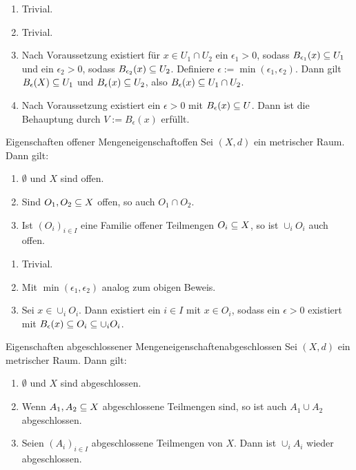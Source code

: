 \begin{beweis}
\begin{enumerate}
\item Trivial.
\item Trivial.
\item Nach Voraussetzung existiert für $x \in U_1 \cap U_2$ ein $\epsilon_1 > 0$, sodass $B_{\epsilon_1} (x) \subseteq U_1$ und ein $\epsilon_2 > 0$, sodass $B_{\epsilon_2} (x) \subseteq U_2$. Definiere $\epsilon := \min (\epsilon_1, \epsilon_2)$. Dann gilt $B_\epsilon (X) \subseteq U_1$ und $B_\epsilon (x) \subseteq U_2$, also $B_\epsilon (x) \subseteq U_1 \cap U_2$.
\item Nach Voraussetzung existiert ein $\epsilon > 0$ mit $B_\epsilon (x) \subseteq U$. Dann ist die Behauptung durch $V:=B_\epsilon(x)$ erfüllt.
\end{enumerate}
\end{beweis}
\begin{satz}{Eigenschaften offener Mengen}{eigenschaftoffen}
Sei $(X,d)$ ein metrischer Raum. Dann gilt:
\begin{enumerate}
\item $\emptyset$ und $X$ sind offen.
\item Sind $O_1, O_2 \subseteq X$ offen, so auch $O_1 \cap O_2$.
\item Ist $(O_i)_{i \in I}$ eine Familie offener Teilmengen $O_i \subseteq X$, so ist $\cup_i O_i$ auch offen.
\end{enumerate}
\end{satz}
\begin{beweis}
\begin{enumerate}
\item Trivial.
\item Mit $\min (\epsilon_1, \epsilon_2)$ analog zum obigen Beweis.
\item Sei $x \in \cup_i O_i$. Dann existiert ein $i \in I$ mit $x \in O_i$, sodass ein $\epsilon > 0$ existiert mit $B_\epsilon(x) \subseteq O_i \subseteq \cup_i O_i$.
\end{enumerate}
\end{beweis}
\begin{satz}{Eigenschaften abgeschlossener Mengen}{eigenschaftenabgeschlossen}
Sei $(X,d)$ ein metrischer Raum. Dann gilt:
\begin{enumerate}[({A}1)]
\item $\emptyset$ und $X$ sind abgeschlossen.
\item Wenn $A_1, A_2 \subseteq X$ abgeschlossene Teilmengen sind, so ist auch $A_1 \cup A_2$ abgeschlossen.
\item Seien $(A_i)_{i \in I}$ abgeschlossene Teilmengen von $X$. Dann ist $\cup_i A_i$ wieder abgeschlossen.
\end{enumerate}
\end{satz}
